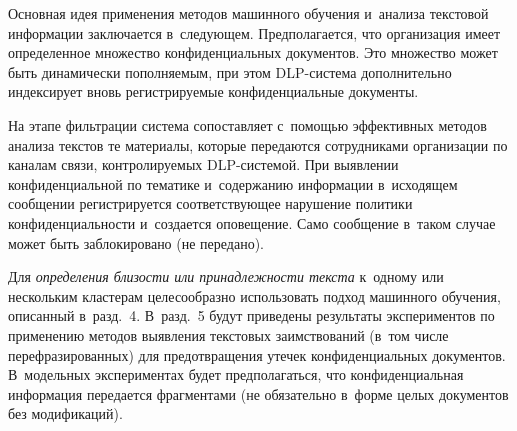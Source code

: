 \begin{multicols}{2}
  Основная идея применения методов ма\-шин\-ного обучения и~анализа 
текстовой информации заключается  
в~сле\-ду\-ющем. Предполагается, что организация имеет определенное 
множество конфиденциальных документов. Это множество может быть 
динамически пополняемым, при этом DLP-сис\-те\-ма дополнительно 
индексирует вновь регистрируемые конфиденциальные документы.
  
  На этапе фильтрации система сопоставляет с~помощью эффективных 
методов анализа текстов те материалы, которые передаются сотрудниками 
организации по каналам связи, конт\-ро\-ли\-ру\-емых DLP-сис\-те\-мой. При 
выявлении конфиденциальной по тематике и~содержанию информации 
в~исходящем сообщении регистрируется соответствующее нарушение политики 
конфиденциальности и~создается оповещение. Само сообщение в~таком 
случае может быть заблокировано (не передано). 
  
  Для \textit{определения близости или принадлежности текста} к~одному 
или  нескольким клас\-те\-рам целесообразно использовать подход машинного 
обучения, описанный в~разд.~4. В~разд.~5 будут приведены результаты 
экспериментов по применению методов выявления текстовых заимствований 
(в~том чис\-ле перефразированных) для предотвращения утечек 
конфиденциальных документов. В~модельных экспериментах будет 
предполагаться, что конфиденциальная информация передается фрагментами 
(не обязательно в~форме целых документов без модификаций).

\begin{table*}\small %
\begin{center}
     \vspace*{3pt}
     

\end{center}
\end{table*}
\end{multicols}
